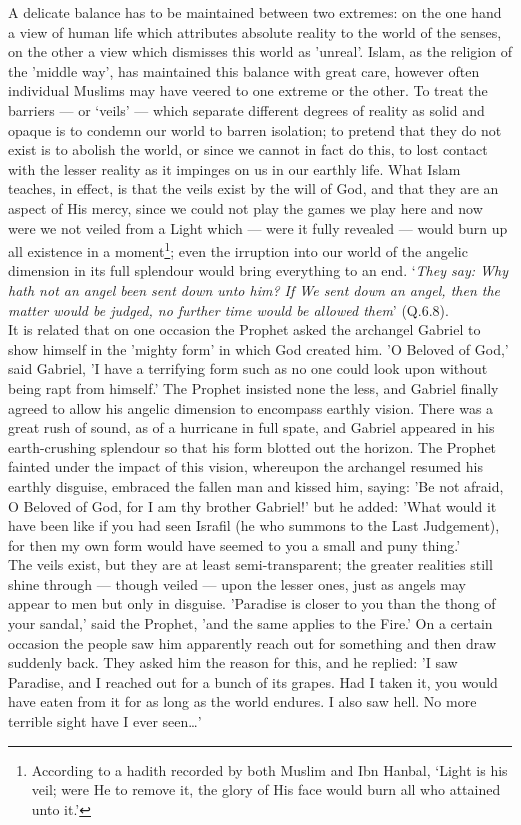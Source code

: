 \documentclass[10pt, twoside]{book}
\begin{document}
A delicate balance has to be maintained between two extremes: on the one hand a view of human life 
which attributes absolute reality to the world of the senses, on the other a view which dismisses 
this world as 'unreal'. Islam, as the religion of the 'middle way', has maintained this balance with 
great care, however often individual Muslims may have veered to one extreme or the other. To treat 
the barriers --- or `veils' --- which separate different degrees of reality as solid and opaque is to 
condemn our world to barren isolation; to pretend that they do not exist is to abolish the world, or 
since we cannot in fact do this, to lost contact with the lesser reality as it impinges on us in our 
earthly life. What Islam teaches, in effect, is that the veils exist by the will of God, and that 
they are an aspect of His mercy, since we could not play the games we play here and now were we not 
veiled from a Light which --- were it fully revealed --- would burn up all existence in a moment\footnote{According to a hadith recorded by both Muslim and Ibn Hanbal, `Light is his veil; were He to remove 
it, the glory of His face would burn all who attained unto it.'}; even 
the irruption into our world of the angelic dimension in its full splendour would bring everything to 
an end. `\emph{They say: Why hath not an angel been sent down unto him? If We sent down an angel, then the 
matter would be judged, no further time would be allowed them}' (Q.6.8). \\

It is related that on one occasion the Prophet asked the archangel Gabriel to show himself in the 
'mighty form' in which God created him. 'O Beloved of God,' said Gabriel, 'I have a terrifying form 
such as no one could look upon without being rapt from himself.' The Prophet insisted none the less, 
and Gabriel finally agreed to allow his angelic dimension to encompass earthly vision. There was a 
great rush of sound, as of a hurricane in full spate, and Gabriel appeared in his earth\hyp{}crushing 
splendour so that his form blotted out the horizon. The Prophet fainted under the impact of this 
vision, whereupon the archangel resumed his earthly disguise, embraced the fallen man and kissed him, 
saying: 'Be not afraid, O Beloved of God, for I am thy brother Gabriel!' but he added: 'What would it 
have been like if you had seen Israfil (he who summons to the Last Judgement), for then my own form 
would have seemed to you a small and puny thing.' \\

The veils exist, but they are at least semi-transparent; the greater realities still shine through --- 
though veiled --- upon the lesser ones, just as angels may appear to men but only in disguise. 
'Paradise is closer to you than the thong of your sandal,' said the Prophet, 'and the same applies to 
the Fire.' On a certain occasion the people saw him apparently reach out for something and then draw 
suddenly back. They asked him the reason for this, and he replied: 'I saw Paradise, and I reached out 
for a bunch of its grapes. Had I taken it, you would have eaten from it for as long as the world 
endures. I also saw hell. No more terrible sight have I ever seen\ldots{}' \\
\end{document}
